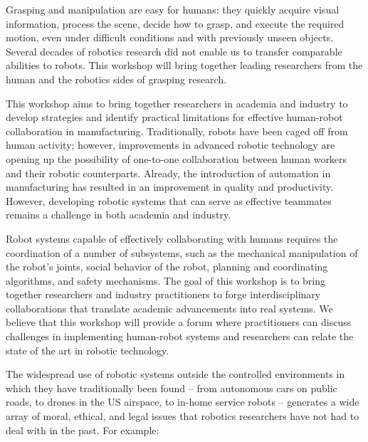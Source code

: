 \begin{spacing}{1.0}
{
Grasping and manipulation are easy for humans: they quickly acquire visual information, process the scene, decide how to grasp, and execute the required motion, even under difficult conditions and with previously unseen objects. Several decades of robotics research did not enable us to transfer comparable abilities to robots. This workshop will bring together leading researchers from the human and the robotics sides of grasping research.
}



{
This workshop aims to bring together researchers in academia and industry to develop strategies and identify practical limitations for effective human-robot collaboration in manufacturing. Traditionally, robots have been caged off from human activity; however, improvements in advanced robotic technology are opening up the possibility of one-to-one collaboration between human workers and their robotic counterparts. Already, the introduction of automation in manufacturing has resulted in an improvement in quality and productivity. However, developing robotic systems that can serve as effective teammates remains a challenge in both academia and industry.

Robot systems capable of effectively collaborating with humans requires the coordination of a number of subsystems, such as the mechanical manipulation of the robot’s joints, social behavior of the robot, planning and coordinating algorithms, and safety mechanisms. The goal of this workshop is to bring together researchers and industry practitioners to forge interdisciplinary collaborations that translate academic advancements into real systems. We believe that this workshop will provide a forum where practitioners can discuss challenges in implementing human-robot systems and researchers can relate the state of the art in robotic technology.
}


{
The widespread use of robotic systems outside the controlled environments in which they have traditionally been found – from autonomous cars on public roads, to drones in the US airspace, to in-home service robots – generates a wide array of moral, ethical, and legal issues that robotics researchers have not had to deal with in the past. For example:

}
\end{spacing}

